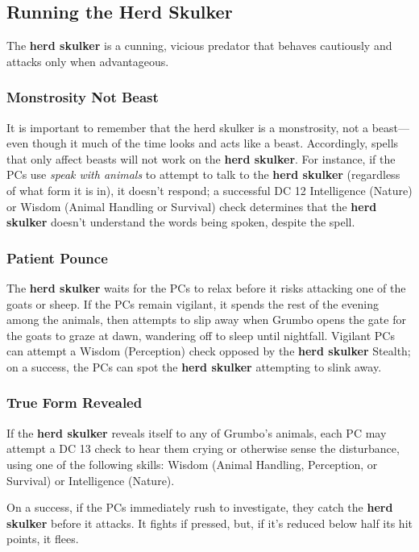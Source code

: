 \documentclass[10pt,a4paper,twoside,bg=print,twocolumn,openany,nodeprecatedcode]{dndbook}
\begin{document}
\subsection{Running the Herd Skulker}
The \textbf{herd skulker} is a cunning, vicious predator that behaves cautiously and attacks only when advantageous.

\subsubsection{Monstrosity Not Beast}
It is important to remember that the herd skulker is a monstrosity, not a beast—even though it much of the time looks and acts like a beast. Accordingly, spells that only affect beasts will not work on the \textbf{herd skulker}. For instance, if the PCs use \textit{speak with animals} to attempt to talk to the \textbf{herd skulker} (regardless of what form it is in), it doesn't respond; a successful DC 12 Intelligence (Nature) or Wisdom (Animal Handling or Survival) check determines that the \textbf{herd skulker} doesn't understand the words being spoken, despite the spell.

\subsubsection{Patient Pounce}
The \textbf{herd skulker} waits for the PCs to relax before it risks attacking one of the goats or sheep. If the PCs remain vigilant, it spends the rest of the evening among the animals, then attempts to slip away when Grumbo opens the gate for the goats to graze at dawn, wandering off to sleep until nightfall. Vigilant PCs can attempt a Wisdom (Perception) check opposed by the \textbf{herd skulker} Stealth; on a success, the PCs can spot the \textbf{herd skulker} attempting to slink away.

\subsubsection{True Form Revealed}
If the \textbf{herd skulker} reveals itself to any of Grumbo's animals, each PC may attempt a DC 13 check to hear them crying or otherwise sense the disturbance, using one of the following skills: Wisdom (Animal Handling, Perception, or Survival) or Intelligence (Nature).

On a success, if the PCs immediately rush to investigate, they catch the \textbf{herd skulker} before it attacks. It fights if pressed, but, if it's reduced below half its hit points, it flees.
\end{document}

